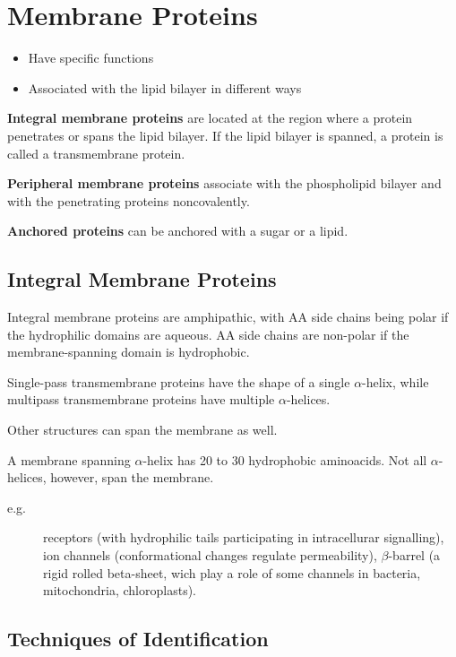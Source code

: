 \documentclass[11pt]{scrartcl}
\begin{document}
\section{Membrane Proteins}


\begin{itemize}
\item Have specific functions
\item Associated with the lipid bilayer in different ways
\end{itemize}

\textbf{Integral membrane proteins} are located at the region where a protein penetrates or spans the lipid bilayer. If the lipid bilayer is spanned, a protein is called a transmembrane protein.

\textbf{Peripheral membrane proteins} associate with the phospholipid
bilayer and with the penetrating proteins noncovalently.

\textbf{Anchored proteins} can be anchored with a sugar or a lipid.

\subsection{Integral Membrane Proteins}

Integral membrane proteins are amphipathic, with AA side chains being
polar if the hydrophilic domains are aqueous. AA side chains are
non-polar if the membrane-spanning domain is hydrophobic.

Single-pass transmembrane proteins have the shape of a single
$\alpha$-helix, while multipass transmembrane proteins have multiple
$\alpha$-helices.

Other structures can span the membrane as well.

A membrane spanning $\alpha$-helix has 20 to 30 hydrophobic
aminoacids. Not all $\alpha$-helices, however, span the membrane.

\begin{description}

\item[e.g.] receptors (with hydrophilic tails participating in
  intracellurar signalling), ion channels (conformational changes
  regulate permeability), $\beta$-barrel (a rigid rolled beta-sheet,
  wich play a role of some channels in bacteria, mitochondria,
  chloroplasts).

\end{description}

\subsection{Techniques of Identification}
\end{document}
